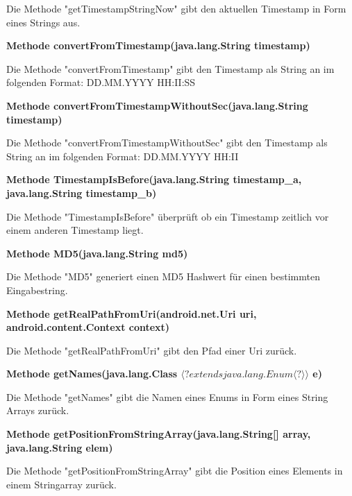 \documentclass{scrartcl}
\begin{document}
\noindent Die Methode "getTimestampStringNow" gibt den aktuellen Timestamp in Form eines Strings aus. \newline 

\noindent\textbf{Methode convertFromTimestamp(java.lang.String timestamp)}

\noindent Die Methode "convertFromTimestamp" gibt den Timestamp als String an im folgenden Format: DD.MM.YYYY HH:II:SS \newline 

\noindent\textbf{Methode convertFromTimestampWithoutSec(java.lang.String timestamp)}

\noindent Die Methode "convertFromTimestampWithoutSec" gibt den Timestamp als String an im folgenden Format: DD.MM.YYYY HH:II \newline 

\noindent\textbf{Methode TimestampIsBefore(java.lang.String timestamp\_a, \newline          java.lang.String timestamp\_b)}

\noindent Die Methode "TimestampIsBefore" überprüft ob ein Timestamp zeitlich vor einem anderen Timestamp liegt. \newline

\noindent\textbf{Methode MD5(java.lang.String md5)}

\noindent Die Methode "MD5" generiert einen MD5 Hashwert für einen bestimmten Eingabestring. \newline

\noindent\textbf{Methode getRealPathFromUri(android.net.Uri uri, \newline                  android.content.Context context)}

\noindent Die Methode "getRealPathFromUri" gibt den Pfad einer Uri zurück. \newline

\noindent\textbf{Methode getNames(java.lang.Class $\langle? extends java.lang.Enum\langle?\rangle\rangle$ e)}

\noindent Die Methode "getNames" gibt die Namen eines Enums in Form eines String Arrays zurück. \newline 

\noindent\textbf{Methode getPositionFromStringArray(java.lang.String[] array, \newline
                                             java.lang.String elem)}

\noindent Die Methode "getPositionFromStringArray" gibt die Position eines Elements in einem Stringarray zurück. \newline 
\end{document}
